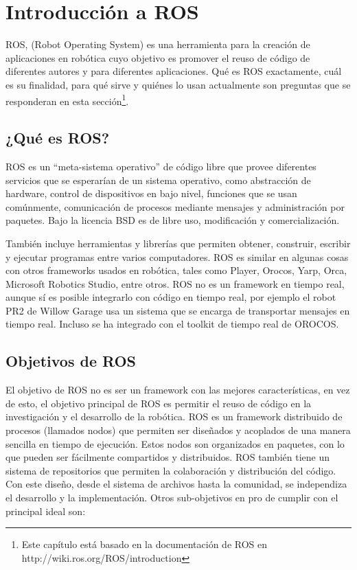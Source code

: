 \chapter{Introducción a ROS\protect}

ROS, (Robot Operating System) es una herramienta para la creación de aplicaciones en robótica cuyo objetivo es promover el reuso de código de diferentes autores y para diferentes aplicaciones. Qué es ROS exactamente, cuál es su finalidad, para qué sirve y quiénes lo usan actualmente son preguntas que se responderan en esta sección\footnote{Este capítulo está basado en la documentación de ROS en http://wiki.ros.org/ROS/introduction}.

\section{¿Qué es ROS?}

ROS es un “meta-sistema operativo” de código libre que provee diferentes servicios que se esperarían de un sistema operativo, como abstracción de hardware, control de dispositivos en bajo nivel, funciones que se usan comúnmente, comunicación de procesos mediante mensajes y administración por paquetes. Bajo la licencia BSD es de libre uso, modificación y comercialización.

También incluye herramientas y librerías que permiten obtener, construir, escribir y ejecutar programas entre varios computadores. ROS es similar en algunas cosas con otros frameworks usados en robótica, tales como Player, Orocos, Yarp, Orca, Microsoft Robotics Studio, entre otros. ROS no es un framework en tiempo real, aunque sí es posible integrarlo con código en tiempo real, por ejemplo el robot PR2 de Willow Garage usa un sistema que se encarga de transportar mensajes en tiempo real. Incluso se ha integrado con el toolkit de tiempo real de OROCOS.


\section{Objetivos de ROS}

El objetivo de ROS no es ser un framework con las mejores características, en vez de esto, el objetivo principal de ROS es permitir el reuso de código en la investigación y el desarrollo de la robótica. ROS es un framework distribuido de procesos (llamados nodos) que permiten ser diseñados y acoplados de una manera sencilla en tiempo de ejecución. Estos nodos son organizados en paquetes, con lo que pueden ser fácilmente compartidos y distribuidos. ROS también tiene un sistema de repositorios que permiten la colaboración y distribución del código. Con este diseño, desde el sistema de archivos hasta la comunidad, se independiza el desarrollo y la implementación. Otros sub-objetivos en pro de cumplir con el  principal ideal son:

